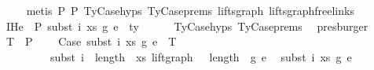 \begin{isabellebody}
\ \ \ \isamarkupfalse%
\ {\isacharparenleft}{\kern0pt}metis\ P{}\ P{}\ TyCase{\isachardot}{\kern0pt}hyps{\isacharparenleft}{\kern0pt}{}{\isacharparenright}{\kern0pt}\ TyCase{\isachardot}{\kern0pt}prems{\isacharparenleft}{\kern0pt}{}{\isacharcomma}{\kern0pt}{}{\isacharparenright}{\kern0pt}\ lifts{\isacharunderscore}{\kern0pt}graph{}\ lifts{\isacharunderscore}{\kern0pt}graph{\isacharunderscore}{\kern0pt}freelinks{\isacharparenright}{\kern0pt}\isanewline
\isanewline
\ \ \isamarkupfalse%
\ IHe{}{\isacharcolon}{\kern0pt}\ {\isachardoublequoteopen}{\isasymGamma}{}\ {\isasymturnstile}{\isacharbraceleft}{\kern0pt}P{\isacharbraceright}{\kern0pt}\ subst\ i\ xs\ g{}\ e{}\ {\isacharcolon}{\kern0pt}\ ty{}{\isacharprime}{\kern0pt}{\isachardoublequoteclose}\isanewline
\ \ \ \ \isamarkupfalse%
\ TyCase{\isachardot}{\kern0pt}hyps{\isacharparenleft}{\kern0pt}{}{\isacharparenright}{\kern0pt}\ TyCase{\isachardot}{\kern0pt}prems{\isacharparenleft}{\kern0pt}{}{\isacharcomma}{\kern0pt}{}{\isacharcomma}{\kern0pt}{}{\isacharcomma}{\kern0pt}{}{\isacharcomma}{\kern0pt}{}{\isacharparenright}{\kern0pt}\ \isamarkupfalse%
\ presburger\isanewline
\isanewline
\ \ \isamarkupfalse%
\ T{}{\isacharcolon}{\kern0pt}\ {\isachardoublequoteopen}{\isasymGamma}{}\ {\isasymturnstile}{\isacharbraceleft}{\kern0pt}P{\isacharbraceright}{\kern0pt}\isanewline
\ \ \ \ Case\ {\isacharparenleft}{\kern0pt}subst\ i\ xs\ g{}\ e{}{\isacharparenright}{\kern0pt}\ {\isasymGamma}{}{\isacharprime}{\kern0pt}\ T\isanewline
\ \ \ \ \ \ \ \ \ {\isacharparenleft}{\kern0pt}subst\ {\isacharparenleft}{\kern0pt}i\ {\isacharplus}{\kern0pt}\ length\ {\isasymGamma}{}{\isacharprime}{\kern0pt}{\isacharparenright}{\kern0pt}\ xs\ {\isacharparenleft}{\kern0pt}{\isacharparenleft}{\kern0pt}lift{\isacharunderscore}{\kern0pt}graph\ {}\ {\isacharcircum}{\kern0pt}{\isacharcircum}{\kern0pt}\ {\isacharparenleft}{\kern0pt}length\ {\isasymGamma}{}{\isacharprime}{\kern0pt}{\isacharparenright}{\kern0pt}{\isacharparenright}{\kern0pt}\ g{}{\isacharparenright}{\kern0pt}\ e{}{\isacharparenright}{\kern0pt}\isanewline
\ \ {\isacharparenleft}{\kern0pt}subst\ i\ xs\ g{}\ e{}{\isacharparenright}{\kern0pt}\isanewline

\end{isabellebody}
